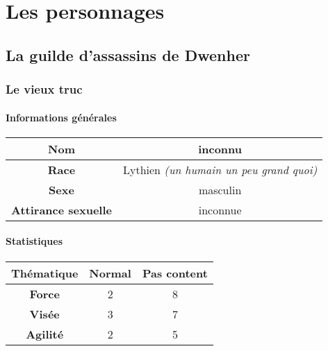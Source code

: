 \documentclass[11pt,a4paper]{book}
\begin{document}
\chapter{Les personnages}

\section{La guilde d'assassins de Dwenher}

\subsection{Le vieux truc}

\subsubsection{Informations générales}

\begin{tabular}{|c|c|}
\hline
\textbf{Nom} & inconnu \\
\hline
\textbf{Race} & Lythien \textit{(un humain un peu grand quoi)} \\
\hline
\textbf{Sexe} & masculin \\
\hline
\textbf{Attirance sexuelle} & inconnue \\
\hline
\end{tabular}

\subsubsection{Statistiques}

\begin{tabular}{|c|c|c|}
\hline
\textbf{Thématique} & \textbf{Normal} & \textbf{Pas content} \\
\hline
\textbf{Force} & 2 & 8 \\
\hline
\textbf{Visée} & 3 & 7 \\
\hline
\textbf{Agilité} & 2 & 5 \\
\hline
\end{tabular}
\end{document}
